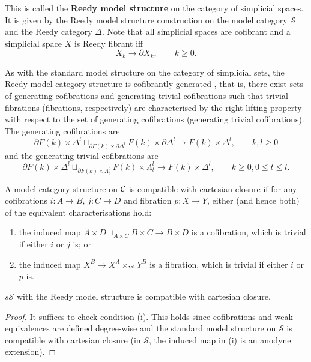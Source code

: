 This is called the {\bf Reedy model structure} on the category of simplicial spaces. It is given by the Reedy model structure construction on the model category $\mathcal S$ and the Reedy category $\Delta$. Note that all simplicial spaces are cofibrant and a simplicial space $X$ is Reedy fibrant iff
$$X_k\to\partial X_k,\qquad k\ge 0.$$

As with the standard model structure on the category of simplicial sets, the Reedy model category structure is cofibrantly generated \cite{dhk}, that is, there exist sets of generating cofibrations and generating trivial cofibrations such that trivial fibrations (fibrations, respectively) are characterised by the right lifting property with respect to the set of generating cofibrations (generating trivial cofibrations). The generating cofibrations are
$$\partial F(k)\times \Delta^l\sqcup_{\partial F(k)\times\partial\Delta^l}F(k)\times\partial\Delta^l\to F(k)\times\Delta^l,\qquad k,l\ge0$$
and the generating trivial cofibrations are
$$\partial F(k)\times \Delta^l\sqcup_{\partial F(k)\times\Lambda^l_t}F(k)\times\Lambda^l_t\to F(k)\times\Delta^l,\qquad k\ge0,0\le t\le l.$$

\begin{defin}
A model category structure on $\cal C$ is compatible with cartesian closure if for any cofibrations $i:A\to B$, $j:C\to D$ and fibration $p:X\to Y$, either (and hence both) of the equivalent characterisations hold:
\begin{enumerate}
\item the induced map $A\times D\sqcup_{A\times C}B\times C\to B\times D$ is a cofibration, which is trivial if either $i$ or $j$ is; or
\item the induced map $X^B\to X^A\times_{Y^A}Y^B$ is a fibration, which is trivial if either $i$ or $p$ is.
\end{enumerate}
\end{defin}

\begin{prop}
$s\mathcal S$ with the Reedy model structure is compatible with cartesian closure.
\end{prop}
\begin{proof}
It suffices to check condition (i). This holds since cofibrations and weak equivalences are defined degree-wise and the standard model structure on $\mathcal S$ is compatible with cartesian closure (in $\mathcal S$, the induced map in (i) is an anodyne extension).
\end{proof}

